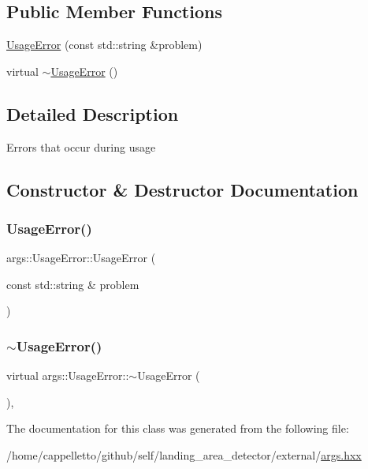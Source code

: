 \subsection*{Public Member Functions}
\begin{DoxyCompactItemize}
\item 
\hyperlink{classargs_1_1_usage_error_ab2f1ccc60b4d2213732c97daa5ffb031}{Usage\+Error} (const std\+::string \&problem)
\item 
virtual \hyperlink{classargs_1_1_usage_error_a460414d83201ce74b602af0c11ee58ba}{$\sim$\+Usage\+Error} ()
\end{DoxyCompactItemize}


\subsection{Detailed Description}
Errors that occur during usage 

\subsection{Constructor \& Destructor Documentation}
\mbox{\label{classargs_1_1_usage_error_ab2f1ccc60b4d2213732c97daa5ffb031}} 
\subsubsection{\texorpdfstring{Usage\+Error()}{UsageError()}}
{\footnotesize\ttfamily args\+::\+Usage\+Error\+::\+Usage\+Error (\begin{DoxyParamCaption}\item[{const std\+::string \&}]{problem }\end{DoxyParamCaption})\hspace{0.3cm}{\ttfamily [inline]}}

\mbox{\label{classargs_1_1_usage_error_a460414d83201ce74b602af0c11ee58ba}} 
\subsubsection{\texorpdfstring{$\sim$\+Usage\+Error()}{~UsageError()}}
{\footnotesize\ttfamily virtual args\+::\+Usage\+Error\+::$\sim$\+Usage\+Error (\begin{DoxyParamCaption}{ }\end{DoxyParamCaption})\hspace{0.3cm}{\ttfamily [inline]}, {\ttfamily [virtual]}}



The documentation for this class was generated from the following file\+:\begin{DoxyCompactItemize}
\item 
/home/cappelletto/github/self/landing\+\_\+area\+\_\+detector/external/\hyperlink{args_8hxx}{args.\+hxx}\end{DoxyCompactItemize}
